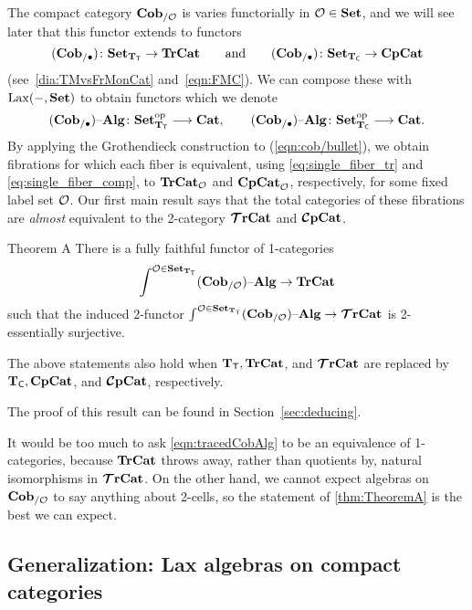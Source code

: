 \documentclass[11pt,oneside,article]{memoir}
\begin{document}
The compact category $\mathbf{Cob}_{/\mathcal{O}}$ is varies functorially in $\mathcal{O}\in\mathbf{Set}$, and we will see later that
this functor extends to functors
\begin{equation*}
   (\mathbf{Cob}_{/\bullet})\colon\mathbf{Set}_{\mathbf{T}_{\mathsf{T}}}\to\mathbf{TrCat}\qquad\textnormal{and}
   \qquad
   (\mathbf{Cob}_{/\bullet})\colon\mathbf{Set}_{\mathbf{T}_{\mathsf{C}}}\to\mathbf{CpCat}
\end{equation*}
(see~\eqref{dia:TMvsFrMonCat} and~\eqref{eqn:FMC}). We can compose these with $\operatorname{Lax}(-,\mathbf{Set})$ to
obtain functors which we denote
\begin{equation}\label{eqn:cob/bullet}
   (\mathbf{Cob}_{/\bullet}){\text \textendash}\mathbf{Alg}\colon\mathbf{Set}_{\mathbf{T}_{\mathsf{T}}}^{\mathrm{op}}\longrightarrow\mathbf{Cat},
   \qquad
   (\mathbf{Cob}_{/\bullet}){\text \textendash}\mathbf{Alg}\colon\mathbf{Set}_{\mathbf{T}_{\mathsf{C}}}^{\mathrm{op}}\longrightarrow\mathbf{Cat}.
\end{equation}
By applying the Grothendieck construction to (\ref{eqn:cob/bullet}), we obtain fibrations for which each fiber is equivalent, using \eqref{eq:single_fiber_tr} and \eqref{eq:single_fiber_comp},
to $\mathbf{TrCat}_{\mathcal{O}}$ and $\mathbf{CpCat}_{\mathcal{O}}$, respectively, for some fixed label set $\mathcal{O}$. Our
first main result says that the total categories of these fibrations are \emph{almost} equivalent to
the 2-category $\bm{\mathcal{T}}\mathbf{rCat}$ and $\bm{\mathcal{C}}\mathbf{pCat}$.

\begin{named}{Theorem A}\label{thm:TheoremA_statement}
  There is a fully faithful functor of 1-categories
  \begin{equation}\label{eqn:tracedCobAlg}
     \int^{\mathcal{O}\in\mathbf{Set}_{\mathbf{T}_{\mathsf{T}}}}(\mathbf{Cob}_{/\mathcal{O}}){\text \textendash}\mathbf{Alg} \to \mathbf{TrCat}
  \end{equation}
  such that the induced 2-functor $\int^{\mathcal{O}\in\mathbf{Set}_{\mathbf{T}_{\mathsf{T}}}}(\mathbf{Cob}_{/\mathcal{O}}){\text \textendash}\mathbf{Alg}\to\bm{\mathcal{T}}\mathbf{rCat}$ is 2-essentially surjective. 

  The above statements also hold when $\mathbf{T}_{\mathsf{T}}, \mathbf{TrCat}$, and $\bm{\mathcal{T}}\mathbf{rCat}$ are replaced by $\mathbf{T}_{\mathsf{C}}, \mathbf{CpCat}$, and $\bm{\mathcal{C}}\mathbf{pCat}$, respectively.
\end{named}

The proof of this result can be found in Section~\ref{sec:deducing}.

\begin{remark}
   It would be too much to ask \eqref{eqn:tracedCobAlg} to be an equivalence of 1-categories, because $\mathbf{TrCat}$ throws away, rather than quotients by, natural isomorphisms in $\bm{\mathcal{T}}\mathbf{rCat}$. On the other hand, we cannot expect algebras on $\mathbf{Cob}_{/\mathcal{O}}$ to say anything about 2-cells, so the statement of \ref{thm:TheoremA} is the best we can expect.
\end{remark}

\subsection{Generalization: Lax algebras on compact categories}
\end{document}

